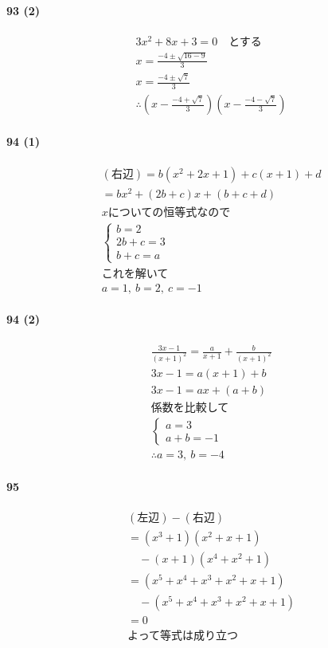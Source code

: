 \documentclass[fleqn,a4j,dvipdfmx,uplatex,twocolumn]{jsarticle}
\begin{document}
\paragraph{93 (2)}
\begin{align*}
  &3x^{2}+8x+3=0 \quad \text{とする} \\
  &x = \frac{-4 \pm \sqrt{16-9}}{3} \\
  &x = \frac{-4 \pm \sqrt{7}}{3} \\
  &\therefore \left(x-\frac{-4+\sqrt{7}}{3}\right)\left(x-\frac{-4-\sqrt{7}}{3}\right)
\end{align*}

\paragraph{94 (1)}
\begin{align*}
  &(\text{右辺}) = b(x^{2}+2x+1)+c(x+1)+d \\
  &= bx^{2}+(2b+c)x+(b+c+d) \\
  &x \text{についての恒等式なので} \\
  &\begin{cases} b=2 \\ 2b+c=3 \\ b+c=a \end{cases} \\
  &\text{これを解いて} \\
  &a=1, \ b=2, \ c=-1
\end{align*}

\paragraph{94 (2)}
\begin{align*}
  &\frac{3x-1}{(x+1)^{2}} = \frac{a}{x+1}+\frac{b}{(x+1)^{2}} \\
  &3x-1 = a(x+1)+b \\
  &3x-1 = ax+(a+b) \\
  &\text{係数を比較して} \\
  &\begin{cases} a=3 \\ a+b=-1 \end{cases} \\
  &\therefore a=3, \ b=-4
\end{align*}

\paragraph{95}
\begin{align*}
  &(\text{左辺})-(\text{右辺}) \\
  &= (x^{3}+1)(x^{2}+x+1) \\
  &\quad -(x+1)(x^{4}+x^{2}+1) \\
  &= (x^{5}+x^{4}+x^{3}+x^{2}+x+1) \\
  &\quad -(x^{5}+x^{4}+x^{3}+x^{2}+x+1) \\
  &= 0 \\
  &\text{よって等式は成り立つ}
\end{align*}
\end{document}
